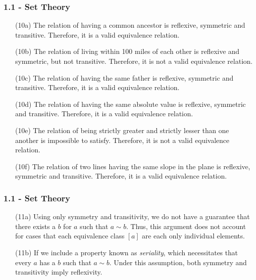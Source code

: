 \documentclass{beamer}
\begin{document}
\begin{frame}
\frametitle{1.1 - Set Theory}
\small
\begin{enumerate}
	\item[(10a)] The relation of having a common ancestor is reflexive, symmetric and transitive. Therefore, it is a valid equivalence relation.
	\item[(10b)] The relation of living within 100 miles of each other is reflexive and symmetric, but not transitive. Therefore, it is not a valid equivalence relation.
	\item[(10c)] The relation of having the same father is reflexive, symmetric and transitive. Therefore, it is a valid equivalence relation.
	\item[(10d)] The relation of having the same absolute value is reflexive, symmetric and transitive. Therefore, it is a valid equivalence relation.
	\item[(10e)] The relation of being strictly greater and strictly lesser than one another is impossible to satisfy. Therefore, it is not a valid equivalence relation.
	\item[(10f)] The relation of two lines having the same slope in the plane is reflexive, symmetric and transitive. Therefore, it is a valid equivalence relation.
\end{enumerate}
\end{frame}
\begin{frame}
\frametitle{1.1 - Set Theory}
\small
\begin{enumerate}
	\item[(11a)] Using only symmetry and transitivity, we do not have a guarantee that there exists a $b$ for $a$ such that $a\sim b$. Thus, this argument does not account for cases that each equivalence class $[a]$ are each only individual elements. 
	\item[(11b)] If we include a property known as \textit{seriality}, which necessitates that every $a$ has a $b$ such that $a\sim b$. Under this assumption, both symmetry and transitivity imply reflexivity.
\end{enumerate}
\end{frame}
\end{document}
